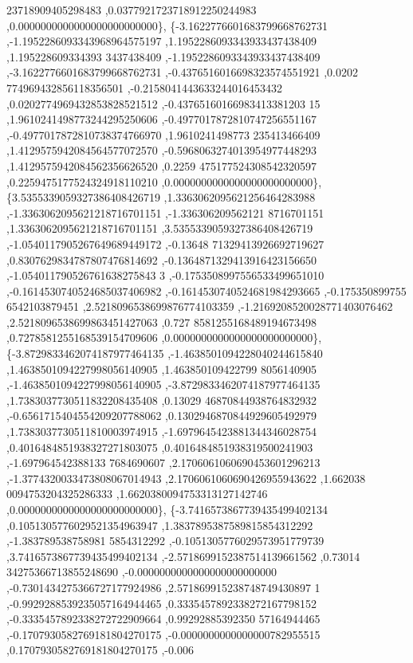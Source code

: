 \begin{DoxyCode}
      23718909405298483 ,0.0377921723718912250244983 ,0.0000000000000000000000000\},
\{-3.1622776601683799668762731 ,-1.1952286093343968964575197 ,1.1952286093343933437438409 ,1.195228609334393
      3437438409 ,-1.1952286093343933437438409 ,-3.1622776601683799668762731 ,-0.4376516016698323574551921 ,0.0202
      774969432856118356501 ,-0.2158041443633244016453432 ,0.0202774969432853828521512 ,-0.43765160166983413381203
      15 ,1.9610241498773244295250606 ,-0.4977017872810747256551167 ,-0.4977017872810738374766970 ,1.9610241498773
      235413466409 ,1.4129575942084564577072570 ,-0.5968063274013954977448293 ,1.4129575942084562356626520 ,0.2259
      475177524308542320597 ,0.2259475177524324918110210 ,0.0000000000000000000000000\},
\{3.5355339059327386408426719 ,1.3363062095621256464283988 ,-1.3363062095621218716701151 ,-1.336306209562121
      8716701151 ,1.3363062095621218716701151 ,3.5355339059327386408426719 ,-1.0540117905267649689449172 ,-0.13648
      71329413926692719627 ,0.8307629834787807476814692 ,-0.1364871329413916423156650 ,-1.054011790526761638275843
      3 ,-0.1753508997556533499651010 ,-0.1614530740524685037406982 ,-0.1614530740524681984293665 ,-0.175350899755
      6542103879451 ,2.5218096538699876774103359 ,-1.2169208520028771403076462 ,2.5218096538699863451427063 ,0.727
      8581255168489194673498 ,0.7278581255168539154709606 ,0.0000000000000000000000000\},
\{-3.8729833462074187977464135 ,-1.4638501094228040244615840 ,1.4638501094227998056140905 ,1.463850109422799
      8056140905 ,-1.4638501094227998056140905 ,-3.8729833462074187977464135 ,1.7383037730511832208435408 ,0.13029
      46870844938764832932 ,-0.6561715404554209207788062 ,0.1302946870844929605492979 ,1.7383037730511810003974915
       ,-1.6979645423881344346028754 ,0.4016484851938327271803075 ,0.4016484851938319500241903 ,-1.697964542388133
      7684690607 ,2.1706061060690453601296213 ,-1.3774320033473808067014943 ,2.1706061060690426955943622 ,1.662038
      0094753204325286333 ,1.6620380094753313127142746 ,0.0000000000000000000000000\},
\{-3.7416573867739435499402134 ,0.1051305776029521354963947 ,1.3837895387589815854312292 ,-1.383789538758981
      5854312292 ,-0.1051305776029573951779739 ,3.7416573867739435499402134 ,-2.5718699152387514139661562 ,0.73014
      34275366713855248690 ,-0.0000000000000000000000000 ,-0.7301434275366727177924986 ,2.571869915238748749430897
      1 ,-0.9929288539235057164944465 ,0.3335457892338272167798152 ,-0.3335457892338272722909664 ,0.99292885392350
      57164944465 ,-0.1707930582769181804270175 ,-0.0000000000000000782955515 ,0.1707930582769181804270175 ,-0.006

\end{DoxyCode}
